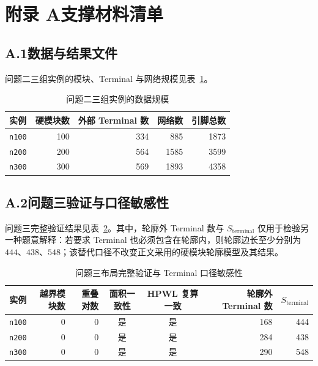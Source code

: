 \section*{附录 A\quad 支撑材料清单}

\subsection*{A.1\quad 数据与结果文件}
问题二三组实例的模块、Terminal 与网络规模见表~\ref{tab:appendix_q2_data_scale}。

\begin{table}[H]
  \centering
  \caption{问题二三组实例的数据规模}
  \label{tab:appendix_q2_data_scale}
  \small
  \begin{tabular}{lrrrr}
    \toprule
    实例 & 硬模块数 & 外部 Terminal 数 & 网络数 & 引脚总数 \\
    \midrule
    \texttt{n100} & 100 & 334 & 885  & 1873 \\
    \texttt{n200} & 200 & 564 & 1585 & 3599 \\
    \texttt{n300} & 300 & 569 & 1893 & 4358 \\
    \bottomrule
  \end{tabular}
\end{table}

\subsection*{A.2\quad 问题三验证与口径敏感性}
问题三完整验证结果见表~\ref{tab:q3_validation_appendix}。其中，轮廓外 Terminal 数与 $S_{\mathrm{terminal}}$ 仅用于检验另一种题意解释：若要求 Terminal 也必须包含在轮廓内，则轮廓边长至少分别为 $444$、$438$、$548$；该替代口径不改变正文采用的硬模块轮廓模型及其结果。

\begin{table}[H]
  \centering
  \caption{问题三布局完整验证与 Terminal 口径敏感性}
  \label{tab:q3_validation_appendix}
  \small
  \renewcommand{\arraystretch}{1.15}
  \begin{tabular}{c r r c c r r}
    \toprule
    实例 & 越界模块数 & 重叠对数 & 面积一致性 & HPWL 复算一致 & 轮廓外 Terminal 数 & $S_{\mathrm{terminal}}$ \\
    \midrule
    \texttt{n100} & 0 & 0 & 是 & 是 & 168 & 444 \\
    \texttt{n200} & 0 & 0 & 是 & 是 & 284 & 438 \\
    \texttt{n300} & 0 & 0 & 是 & 是 & 290 & 548 \\
    \bottomrule
  \end{tabular}
\end{table}

